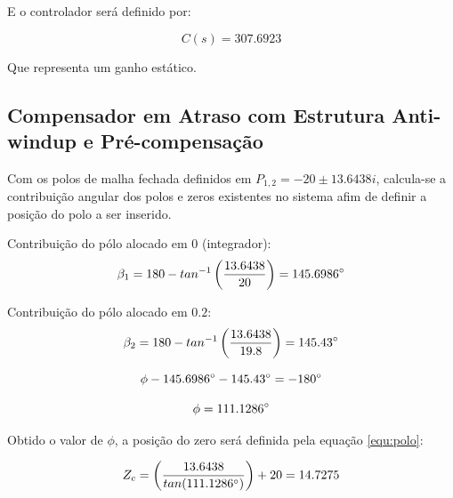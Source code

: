 \documentclass[conference,harvard,brazil,english]{sbatex}
\begin{document}
        E o controlador será definido por:
        
        \begin{equation}
            \label{tf:controlador}
            C(s) = 307.6923
        \end{equation}
        
        Que representa um ganho estático.
        
        \subsection{Compensador em Atraso com Estrutura Anti-windup e Pré-compensação}
        
            Com os polos de malha fechada definidos em $P_{1,2} = -20 \pm 13.6438i$, calcula-se a contribuição angular dos polos e zeros existentes no sistema afim de definir a posição do polo a ser inserido.
            
            Contribuição do pólo alocado em $0$ (integrador):
            \begin{equation}
                \label{res:beta1}
                \beta_1 = 180 - tan^{-1} \left(\frac{13.6438}{20}\right) = 145.6986\degree
            \end{equation}
            
            Contribuição do pólo alocado em $0.2$:
            \begin{equation}
                \label{res:beta1}
                \beta_2 = 180 - tan^{-1} \left(\frac{13.6438}{19.8}\right) = 145.43\degree
            \end{equation}
            
            \begin{equation}
             \phi - 145.6986\degree - 145.43\degree = -180\degree 
            \end{equation}
            
            \begin{equation}
            \label{res:phi}
            \phi = 111.1286\degree    
            \end{equation}
            
            Obtido o valor de $\phi$, a posição do zero será definida pela equação \ref{equ:polo}:
            
            \begin{equation}
                \label{res:poloatraso}
                Z_c = \left(\frac{13.6438}{tan(111.1286\degree)}\right) + 20 = 14.7275
            \end{equation}
            
\end{document}
